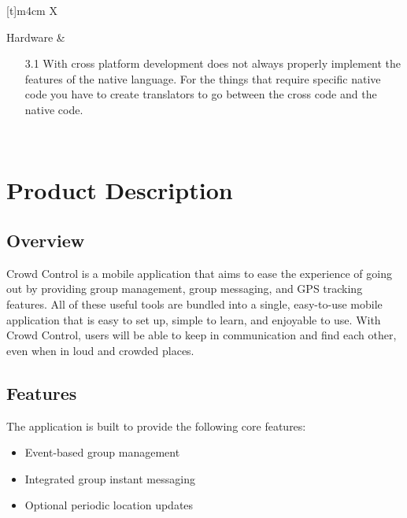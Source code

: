 \begin{center}
\begin{tabularx}{\textwidth}[t]{m{4cm} X}
\hline
{} \\
\hline

Hardware &
\begin{minipage}[t]{\linewidth}%
\begin{itemize}
\item[3.1] With cross platform development does not always properly implement the features of the
native language. For the things that require specific native code you have to create translators to go
between the cross code and the native code.
\end{itemize} 
\end{minipage}\\

\end{tabularx}
\end{center}



\section{Product Description}

\subsection{Overview}

Crowd Control is a mobile application that aims to ease the experience of going out by providing group
management, group messaging, and GPS tracking features. All of these useful tools are bundled into a
single, easy-to-use mobile application that is easy to set up, simple to learn, and enjoyable to use. With
Crowd Control, users will be able to keep in communication and find each other, even when in loud and
crowded places.

\subsection{Features}

The application is built to provide the following core features:

\begin{itemize}
\item Event-based group management
\item Integrated group instant messaging
\item Optional periodic location updates
\end{itemize}

